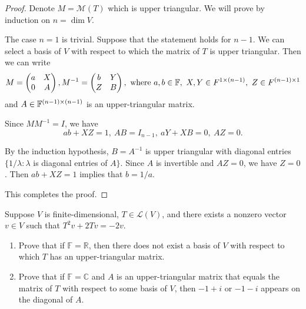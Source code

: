 \documentclass{article}
\begin{document}
\begin{proof}
  Denote \( M=\mathcal{M}(T) \) which is upper triangular. We will prove by induction on \( n=\dim V \). \par
  The case \( n=1 \) is trivial. Suppose that the statement holds for \( n-1 \). We can select a basis of \( V \) with respect to which the matrix of \( T \) is upper triangular. Then we can write
  \[ M=\begin{pmatrix}
    a & X\\
    0 & A
  \end{pmatrix}, M^{-1}=\begin{pmatrix}
    b & Y\\
    Z & B
  \end{pmatrix}, \text{ where }a,b\in\mathbb{F},\ X, Y\in F^{1\times(n-1)},\ Z \in F^{(n-1)\times 1}\]
  and \( A\in\mathbb{F}^{(n-1)\times(n-1)} \) is an upper-triangular matrix.\par
  Since \( MM^{-1}=I \), we have
  \[ ab+XZ=1,\ AB=I_{n-1},\ aY+XB=0,\ AZ=0. \]\par
  By the induction hypothesis, \( B=A^{-1} \) is upper triangular with diagonal entries \( \{1/\lambda:\lambda\) is diagonal entries of \( A\} \). Since \( A \) is invertible and \( AZ=0 \), we have \( Z=0 \). Then \( ab+XZ=1 \) implies that \( b=1/a \). \par
  This completes the proof.
\end{proof}



\begin{problem}[5C-8]
Suppose $V$ is finite-dimensional, $T \in \mathcal{L}(V)$, and there exists a nonzero vector $v \in V$ such that $T^2v + 2Tv = -2v$.
\begin{enumerate}[label=(\alph*)]
\item Prove that if $\mathbb{F} = \mathbb{R}$, then there does not exist a basis of $V$ with respect to which $T$ has an upper-triangular matrix.
\item Prove that if $\mathbb{F} = \mathbb{C}$ and $A$ is an upper-triangular matrix that equals the matrix of $T$ with respect to some basis of $V$, then $-1 + i$ or $-1 - i$ appears on the diagonal of $A$.
\end{enumerate}
\end{problem}
\end{document}

